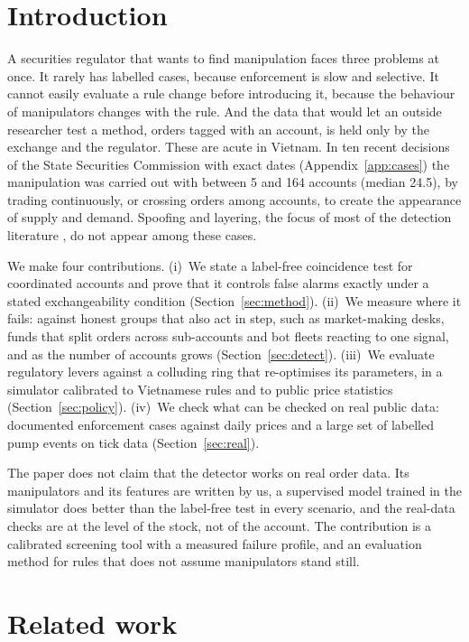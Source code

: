 \documentclass[11pt,a4paper]{article}
\begin{document}
\section{Introduction}

A securities regulator that wants to find manipulation faces three problems at once. It rarely has labelled cases, because enforcement is slow and selective. It cannot easily evaluate a rule change before introducing it, because the behaviour of manipulators changes with the rule. And the data that would let an outside researcher test a method, orders tagged with an account, is held only by the exchange and the regulator. These are acute in Vietnam. In ten recent decisions of the State Securities Commission with exact dates (Appendix~\ref{app:cases}) the manipulation was carried out with between 5 and 164 accounts (median 24.5), by trading continuously, or crossing orders among accounts, to create the appearance of supply and demand. Spoofing and layering, the focus of most of the detection literature \citep{tuccella2021,fabre2025}, do not appear among these cases.

We make four contributions. (i)~We state a label-free coincidence test for coordinated accounts and prove that it controls false alarms exactly under a stated exchangeability condition (Section~\ref{sec:method}). (ii)~We measure where it fails: against honest groups that also act in step, such as market-making desks, funds that split orders across sub-accounts and bot fleets reacting to one signal, and as the number of accounts grows (Section~\ref{sec:detect}). (iii)~We evaluate regulatory levers against a colluding ring that re-optimises its parameters, in a simulator calibrated to Vietnamese rules and to public price statistics (Section~\ref{sec:policy}). (iv)~We check what can be checked on real public data: documented enforcement cases against daily prices and a large set of labelled pump events on tick data (Section~\ref{sec:real}).

The paper does not claim that the detector works on real order data. Its manipulators and its features are written by us, a supervised model trained in the simulator does better than the label-free test in every scenario, and the real-data checks are at the level of the stock, not of the account. The contribution is a calibrated screening tool with a measured failure profile, and an evaluation method for rules that does not assume manipulators stand still.

\section{Related work}
\end{document}
